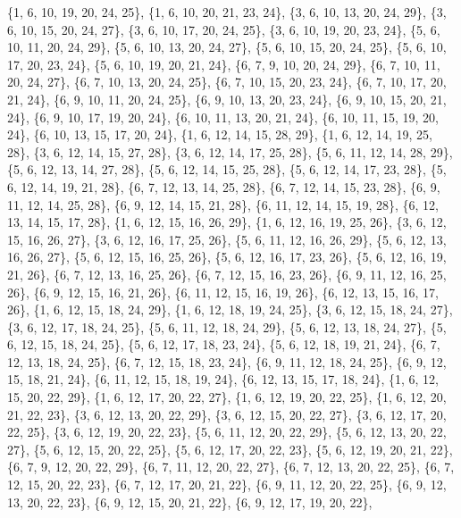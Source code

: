 \documentclass[11pt,a4paper]{article}
\begin{document}
{\{1, 6, 10, 19, 20, 24, 25\}, \{1, 6, 10, 20, 21, 23, 24\}, \{3, 6, 10, 13, 20, 24, 29\}, \{3, 6, 10, 15, 20, 24, 27\}, \{3, 6, 10, 17, 20, 24, 25\},
\{3, 6, 10, 19, 20, 23, 24\}, \{5, 6, 10, 11, 20, 24, 29\}, \{5, 6, 10, 13, 20, 24, 27\}, \{5, 6, 10, 15, 20, 24, 25\}, \{5, 6, 10, 17, 20, 23, 24\},
\{5, 6, 10, 19, 20, 21, 24\}, \{6, 7, 9, 10, 20, 24, 29\}, \{6, 7, 10, 11, 20, 24, 27\}, \{6, 7, 10, 13, 20, 24, 25\}, \{6, 7, 10, 15, 20, 23, 24\},
\{6, 7, 10, 17, 20, 21, 24\}, \{6, 9, 10, 11, 20, 24, 25\}, \{6, 9, 10, 13, 20, 23, 24\}, \{6, 9, 10, 15, 20, 21, 24\}, \{6, 9, 10, 17, 19, 20, 24\},
\{6, 10, 11, 13, 20, 21, 24\}, \{6, 10, 11, 15, 19, 20, 24\}, \{6, 10, 13, 15, 17, 20, 24\}, \{1, 6, 12, 14, 15, 28, 29\}, \{1, 6, 12, 14, 19, 25, 28\},
\{3, 6, 12, 14, 15, 27, 28\}, \{3, 6, 12, 14, 17, 25, 28\}, \{5, 6, 11, 12, 14, 28, 29\}, \{5, 6, 12, 13, 14, 27, 28\}, \{5, 6, 12, 14, 15, 25, 28\},
\{5, 6, 12, 14, 17, 23, 28\}, \{5, 6, 12, 14, 19, 21, 28\}, \{6, 7, 12, 13, 14, 25, 28\}, \{6, 7, 12, 14, 15, 23, 28\}, \{6, 9, 11, 12, 14, 25, 28\},
\{6, 9, 12, 14, 15, 21, 28\}, \{6, 11, 12, 14, 15, 19, 28\}, \{6, 12, 13, 14, 15, 17, 28\}, \{1, 6, 12, 15, 16, 26, 29\}, \{1, 6, 12, 16, 19, 25, 26\},
\{3, 6, 12, 15, 16, 26, 27\}, \{3, 6, 12, 16, 17, 25, 26\}, \{5, 6, 11, 12, 16, 26, 29\}, \{5, 6, 12, 13, 16, 26, 27\}, \{5, 6, 12, 15, 16, 25, 26\},
\{5, 6, 12, 16, 17, 23, 26\}, \{5, 6, 12, 16, 19, 21, 26\}, \{6, 7, 12, 13, 16, 25, 26\}, \{6, 7, 12, 15, 16, 23, 26\}, \{6, 9, 11, 12, 16, 25, 26\},
\{6, 9, 12, 15, 16, 21, 26\}, \{6, 11, 12, 15, 16, 19, 26\}, \{6, 12, 13, 15, 16, 17, 26\}, \{1, 6, 12, 15, 18, 24, 29\}, \{1, 6, 12, 18, 19, 24, 25\},
\{3, 6, 12, 15, 18, 24, 27\}, \{3, 6, 12, 17, 18, 24, 25\}, \{5, 6, 11, 12, 18, 24, 29\}, \{5, 6, 12, 13, 18, 24, 27\}, \{5, 6, 12, 15, 18, 24, 25\},
\{5, 6, 12, 17, 18, 23, 24\}, \{5, 6, 12, 18, 19, 21, 24\}, \{6, 7, 12, 13, 18, 24, 25\}, \{6, 7, 12, 15, 18, 23, 24\}, \{6, 9, 11, 12, 18, 24, 25\},
\{6, 9, 12, 15, 18, 21, 24\}, \{6, 11, 12, 15, 18, 19, 24\}, \{6, 12, 13, 15, 17, 18, 24\}, \{1, 6, 12, 15, 20, 22, 29\}, \{1, 6, 12, 17, 20, 22, 27\},
\{1, 6, 12, 19, 20, 22, 25\}, \{1, 6, 12, 20, 21, 22, 23\}, \{3, 6, 12, 13, 20, 22, 29\}, \{3, 6, 12, 15, 20, 22, 27\}, \{3, 6, 12, 17, 20, 22, 25\},
\{3, 6, 12, 19, 20, 22, 23\}, \{5, 6, 11, 12, 20, 22, 29\}, \{5, 6, 12, 13, 20, 22, 27\}, \{5, 6, 12, 15, 20, 22, 25\}, \{5, 6, 12, 17, 20, 22, 23\},
\{5, 6, 12, 19, 20, 21, 22\}, \{6, 7, 9, 12, 20, 22, 29\}, \{6, 7, 11, 12, 20, 22, 27\}, \{6, 7, 12, 13, 20, 22, 25\}, \{6, 7, 12, 15, 20, 22, 23\},
\{6, 7, 12, 17, 20, 21, 22\}, \{6, 9, 11, 12, 20, 22, 25\}, \{6, 9, 12, 13, 20, 22, 23\}, \{6, 9, 12, 15, 20, 21, 22\}, \{6, 9, 12, 17, 19, 20, 22\},
}
\end{document}

